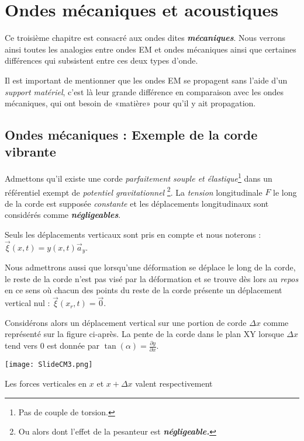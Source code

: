 \chapter{Ondes mécaniques et acoustiques} 

Ce troisième chapitre est consacré aux ondes dites \textit{\textbf{mécaniques}}. Nous verrons ainsi toutes les analogies entre ondes EM et ondes mécaniques ainsi que certaines différences qui subsistent entre ces deux types d'onde.

Il est important de mentionner que les ondes EM se propagent sans l'aide d'un \textit{support matériel}, c'est là leur grande différence en comparaison avec les ondes mécaniques, qui ont besoin de «matière» pour qu'il y ait propagation. 

\section{Ondes mécaniques : Exemple de la corde vibrante}

Admettons qu'il existe une corde \textit{parfaitement souple et élastique}\footnote{Pas de couple de torsion.} dans un référentiel exempt de \textit{potentiel gravitationnel} \footnote{Ou alors dont l'effet de la pesanteur est \textit{\textbf{négligeable.}}}. La \textit{tension} longitudinale $F$ le long de la corde est supposée \textit{constante} et les déplacements longitudinaux sont considérés comme \textit{\textbf{négligeables}}.

Seuls les déplacements verticaux sont pris en compte et nous noterons : $\vec{\xi}(x,t) = y(x,t) \vec{a}_{y}$.

Nous admettrons aussi que lorsqu'une déformation se déplace le long de la corde, le reste de la corde n'est pas visé par la déformation et se trouve dès lors au \textit{repos} en ce sens où chacun des points du reste de la corde présente un déplacement vertical nul : $\vec{\xi}(x_{r},t) = \vec{0}$.

Considérons alors un déplacement vertical sur une portion de corde $\Delta x$ comme représenté sur la figure ci-après.  La pente de la corde dans le plan XY lorsque $\Delta x$ tend vers $0$ est donnée par $\tan (\alpha) = \frac{\partial y}{\partial x}$.

\begin{center}
	\texttt{[image: SlideCM3.png]}
\end{center}

Les forces verticales en $x$ et $x+\Delta x$ valent respectivement

